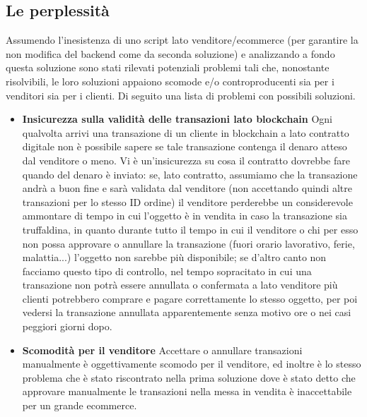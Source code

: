\documentclass[a4paper, 12pt]{article}
\begin{document}
\newpage

\subsection*{Le perplessità}
Assumendo l'inesistenza di uno script lato venditore/ecommerce (per garantire la non modifica del backend come da seconda soluzione) e analizzando a fondo questa soluzione sono stati rilevati potenziali problemi tali che, nonostante risolvibili, le loro soluzioni appaiono scomode e/o controproducenti sia per i venditori sia per i clienti.
Di seguito una lista di problemi con possibili soluzioni.

\begin{itemize}
\item \textbf{Insicurezza sulla validità delle transazioni lato blockchain}
Ogni qualvolta arrivi una transazione di un cliente in blockchain a lato contratto digitale non è possibile sapere se tale transazione contenga il denaro atteso dal venditore o meno.
Vi è un'insicurezza su cosa il contratto dovrebbe fare quando del denaro è inviato: se, lato contratto, assumiamo che la transazione andrà a buon fine e sarà validata dal venditore (non accettando quindi altre transazioni per lo stesso ID ordine) il venditore perderebbe un considerevole ammontare di tempo in cui l'oggetto è in vendita in caso la transazione sia truffaldina, in quanto durante tutto il tempo in cui il venditore o chi per esso non possa approvare o annullare la transazione (fuori orario lavorativo, ferie, malattia...) l'oggetto non sarebbe più disponibile; se d'altro canto non facciamo questo tipo di controllo,
nel tempo sopracitato in cui una transazione non potrà essere annullata o confermata a lato venditore più clienti potrebbero comprare e pagare correttamente lo stesso oggetto, per poi vedersi la transazione annullata
apparentemente senza motivo ore o nei casi peggiori giorni dopo.\\

\item \textbf{Scomodità per il venditore}
Accettare o annullare transazioni manualmente è oggettivamente scomodo per il venditore, ed inoltre è lo stesso problema che è stato riscontrato nella prima soluzione dove è stato detto che approvare manualmente
le transazioni nella messa in vendita è inaccettabile per un grande ecommerce.\\


\end{itemize}
\end{document}
